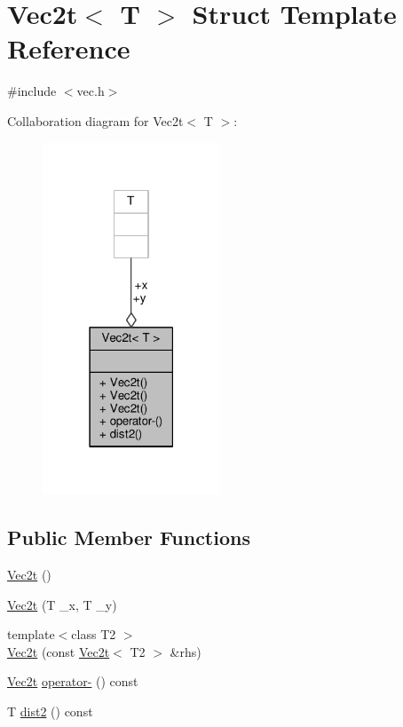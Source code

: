 \hypertarget{structVec2t}{}\section{Vec2t$<$ T $>$ Struct Template Reference}
\label{structVec2t}


{\ttfamily \#include $<$vec.\+h$>$}



Collaboration diagram for Vec2t$<$ T $>$\+:
\nopagebreak
\begin{figure}[H]
\begin{center}
\leavevmode
\includegraphics[width=150pt]{structVec2t__coll__graph}
\end{center}
\end{figure}
\subsection*{Public Member Functions}
\begin{DoxyCompactItemize}
\item 
\hyperlink{structVec2t_a6f9932f3a20db459c57d3be2d593a3a7}{Vec2t} ()
\item 
\hyperlink{structVec2t_a41fc85a32a9b215f05b9297c55528ff7}{Vec2t} (T \+\_\+x, T \+\_\+y)
\item 
{\footnotesize template$<$class T2 $>$ }\\\hyperlink{structVec2t_a4e9175daa9b5fa681594a409b2028a2e}{Vec2t} (const \hyperlink{structVec2t}{Vec2t}$<$ T2 $>$ \&rhs)
\item 
\hyperlink{structVec2t}{Vec2t} \hyperlink{structVec2t_a68504c899d03bf6fe08fd2581ec7bbb7}{operator-\/} () const 
\item 
T \hyperlink{structVec2t_a93ad4ffde1d4e300aa99565092df2d7b}{dist2} () const 
\end{DoxyCompactItemize}
